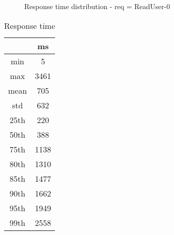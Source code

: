 \begin{minipage}{0.75\linewidth}
\begin{figure}[h]
\begin{adjustbox}{max width=1.0\linewidth, keepaspectratio}
  \end{adjustbox}
  \caption{Response time distribution - req = ReadUser-0}
\end{figure}
\end{minipage}\hfill\begin{minipage}{0.18\linewidth}
\begin{table}[h]
\begin{tabular}{|cc|}
\hline
\textbf{} & \textbf{ms}\\ \hline
 \Xhline{0.005\arrayrulewidth}
min & 5\\
 \Xhline{0.005\arrayrulewidth}
max & 3461\\
 \Xhline{0.005\arrayrulewidth}
mean & 705\\
 \Xhline{0.005\arrayrulewidth}
std & 632\\
\hline
\hline
 \Xhline{0.005\arrayrulewidth}
25th & 220\\
 \Xhline{0.005\arrayrulewidth}
50th & 388\\
 \Xhline{0.005\arrayrulewidth}
75th & 1138\\
 \Xhline{0.005\arrayrulewidth}
80th & 1310\\
 \Xhline{0.005\arrayrulewidth}
85th & 1477\\
 \Xhline{0.005\arrayrulewidth}
90th & 1662\\
 \Xhline{0.005\arrayrulewidth}
95th & 1949\\
 \Xhline{0.005\arrayrulewidth}
99th & 2558\\
\hline
\end{tabular}
\caption{Response time}
\end{table}
\end{minipage}\hfill